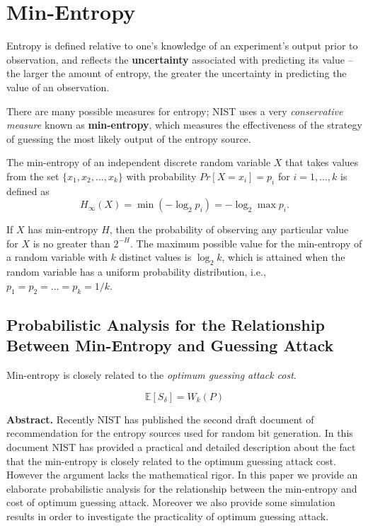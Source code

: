 \documentclass[12pt,openany]{book}
\theoremstyle{definition}
\begin{document}
\newpage
\section*{Min-Entropy}

Entropy is defined relative to one's knowledge of an experiment's output prior to observation, and reflects the \textbf{uncertainty} associated with predicting its value -- the larger the amount of entropy, the greater the uncertainty in predicting the value of an observation.

There are many possible measures for entropy; NIST uses a very \textit{conservative measure} known as \textbf{min-entropy}, which measures the effectiveness of the strategy of guessing the most likely output of the entropy source.

The min-entropy of an independent discrete random variable \(X\) that takes values from the set \(\{x_1, x_2, \ldots, x_k\}\) with probability \(Pr[X=x_i] = p_i\) for \(i=1,\ldots,k\) is defined as
\[ H_{\infty}(X) = \min(-\log_2 p_i) = -\log_2 \max p_i. \]

If \(X\) has min-entropy \(H\), then the probability of observing any particular value for \(X\) is no greater than \(2^{-H}\). The maximum possible value for the min-entropy of a random variable with \(k\) distinct values is \(\log_2 k\), which is attained when the random variable has a uniform probability distribution, i.e., \(p_1 = p_2 = \ldots = p_k = 1/k\).

\subsection*{Probabilistic Analysis for the Relationship Between Min-Entropy and Guessing Attack}

Min-entropy is closely related to the \textit{optimum guessing attack cost}.

\[ \mathbb{E}[S_{\delta}] = W_k(P) \]

\textbf{Abstract.} Recently NIST has published the second draft document of recommendation for the entropy sources used for random bit generation. In this document NIST has provided a practical and detailed description about the fact that the min-entropy is closely related to the optimum guessing attack cost. However the argument lacks the mathematical rigor. In this paper we provide an elaborate probabilistic analysis for the relationship between the min-entropy and cost of optimum guessing attack. Moreover we also provide some simulation results in order to investigate the practicality of optimum guessing attack.
\end{document}
